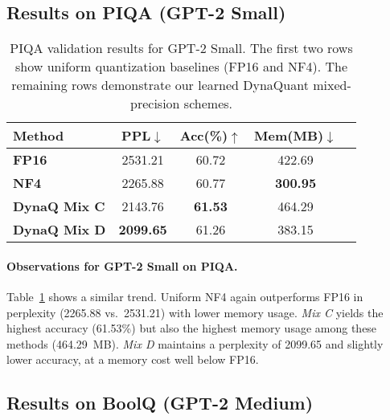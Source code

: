 \documentclass{article}
\begin{document}
	\subsection{Results on PIQA (GPT-2 Small)}
	
	\begin{table}[ht]
		\centering
		\label{tab:piqa-small}
		\begin{tabular}{lcccc}
			\toprule
			\textbf{Method} & \textbf{PPL}$\downarrow$ & \textbf{Acc(\%)}$\uparrow$ & \textbf{Mem(MB)}$\downarrow$ \\
			\midrule
			\textbf{FP16}    & 2531.21 & 60.72 & 422.69 \\
			\textbf{NF4}     & 2265.88 & 60.77 & \textbf{300.95} \\
			\midrule
			\textbf{DynaQ Mix C} & 2143.76 & \textbf{61.53} & 464.29 \\
			\textbf{DynaQ Mix D} & \textbf{2099.65} & 61.26 & 383.15 \\
			\bottomrule
		\end{tabular}
		\caption{\small PIQA validation results for GPT-2 Small. The first two rows show uniform quantization baselines (FP16 and NF4). The remaining rows demonstrate our learned DynaQuant mixed-precision schemes.}
	\end{table}
	
	\paragraph{Observations for GPT-2 Small on PIQA.}
	Table~\ref{tab:piqa-small} shows a similar trend. Uniform NF4 again outperforms FP16 in perplexity (2265.88 vs.\ 2531.21) with lower memory usage. \emph{Mix C} yields the highest accuracy (61.53\%) but also the highest memory usage among these methods (464.29~MB). \emph{Mix D} maintains a perplexity of 2099.65 and slightly lower accuracy, at a memory cost well below FP16.
	
	\subsection{Results on BoolQ (GPT-2 Medium)}
	
\end{document}
